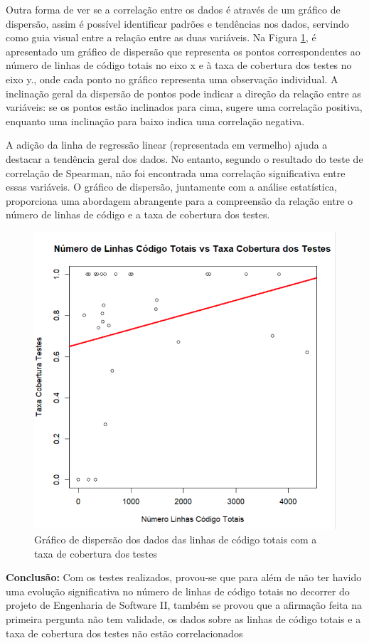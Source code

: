 Outra forma de ver se a correlação entre os dados é através de um gráfico de dispersão, assim é possível identificar padrões e tendências nos dados, servindo como guia visual entre a relação entre as duas variáveis.
Na Figura \ref{fig:ScatterPlotPergunta2}, é apresentado um gráfico de dispersão que representa os pontos correspondentes ao número de linhas de código totais no eixo x e à taxa de cobertura dos testes no eixo y., onde cada ponto no gráfico representa uma observação individual. A inclinação geral da dispersão de pontos pode indicar a direção da relação entre as variáveis: se os pontos estão inclinados para cima, sugere uma correlação positiva, enquanto uma inclinação para baixo indica uma correlação negativa.

A adição da linha de regressão linear (representada em vermelho) ajuda a destacar a tendência geral dos dados. No entanto, segundo o resultado do teste de correlação de Spearman, não foi encontrada uma correlação significativa entre essas variáveis. O gráfico de dispersão, juntamente com a análise estatística, proporciona uma abordagem abrangente para a compreensão da relação entre o número de linhas de código e a taxa de cobertura dos testes.

 \begin{figure}
     \centering
     \includegraphics[width=0.5\linewidth]{imagens//questao2/scatterPlotCorrelacaoPergunta2.png}
     \caption{Gráfico de dispersão dos dados das linhas de código totais com a taxa de cobertura dos testes}
     \label{fig:ScatterPlotPergunta2}
 \end{figure}

  \textbf{Conclusão:} Com os testes realizados, provou-se que para além de não ter havido uma evolução significativa no número de linhas de código totais no decorrer do projeto de Engenharia de Software II, também se provou que a afirmação feita na primeira pergunta não tem validade, os dados sobre as linhas de código totais e a taxa de cobertura dos testes não estão correlacionados